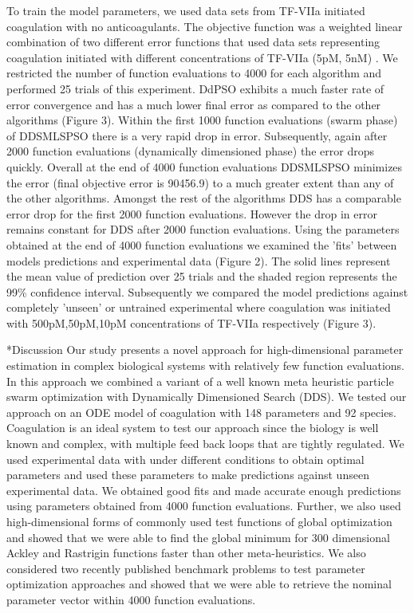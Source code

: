 \documentclass[12pt]{article}
\makeatletter
\renewcommand\section{\@startsection
	{subsection}{2}{0mm}
	{-0.2in}
	{0.05\baselineskip}
	{\normalfont\large\bfseries}}
\makeatother
\begin{document}
 To train the model parameters, we used data sets from TF-VIIa initiated coagulation with no anticoagulants. The objective function was a weighted linear combination of two different error functions that used data sets representing coagulation initiated with different concentrations of TF-VIIa (5pM, 5nM) \cite{hockin2002model}. We restricted the number of function evaluations to 4000 for each algorithm and performed 25 trials of this experiment. DdPSO exhibits a much faster rate of error convergence and has a much lower final error as compared to the other algorithms (Figure 3). Within the first 1000 function evaluations (swarm phase) of DDSMLSPSO there is a very rapid drop in error. Subsequently, again after 2000 function evaluations (dynamically dimensioned phase) the error drops quickly. Overall at the end of 4000 function evaluations DDSMLSPSO minimizes the error (final objective error is 90456.9) to a much greater extent than any of the other algorithms. Amongst the rest of the algorithms DDS has a comparable error drop for the first 2000 function evaluations. However the drop in error remains constant for DDS after 2000 function evaluations. Using the parameters obtained at the end of 4000 function evaluations we examined the 'fits' between models predictions and experimental data (Figure 2). The solid lines represent the mean value of prediction over 25 trials and the shaded region represents the 99\% confidence interval. Subsequently we compared the model predictions against completely 'unseen' or untrained experimental where coagulation was initiated with 500pM,50pM,10pM concentrations of TF-VIIa respectively (Figure 3).

\clearpage
\section*{Discussion}
Our study presents a novel approach for high-dimensional parameter estimation in complex biological systems with relatively few function evaluations. In this approach we combined a variant of a well known meta heuristic particle swarm optimization with Dynamically Dimensioned Search (DDS). We tested our approach on an ODE model of coagulation with 148 parameters and 92 species. Coagulation is an ideal system to test our approach since the biology is well known and complex, with multiple feed back loops that are tightly regulated. We used experimental data with under different conditions to obtain optimal parameters and used these parameters to make predictions against unseen experimental data. We obtained good fits and made accurate enough predictions using parameters obtained from 4000 function evaluations. Further, we also used high-dimensional forms of commonly used test functions of global optimization and showed that we were able to find the global minimum for 300 dimensional Ackley and Rastrigin functions faster than other meta-heuristics. We also considered two recently published benchmark problems to test parameter optimization approaches and showed that we were able to retrieve the nominal parameter vector within 4000 function evaluations.
\end{document}
